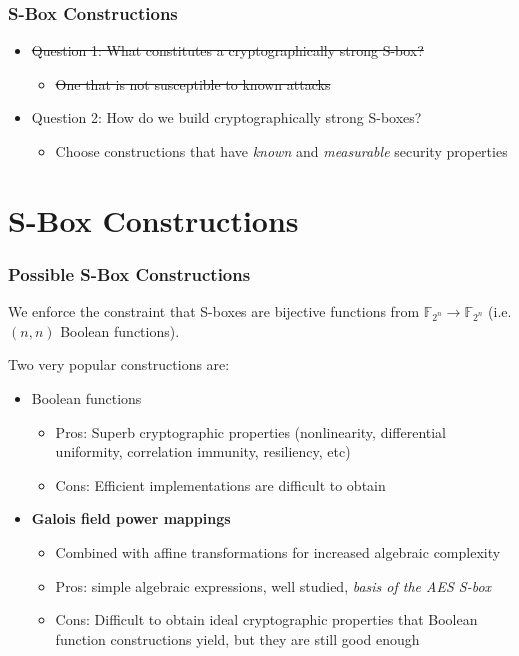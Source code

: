 \documentclass[10pt]{beamer}
\begin{document}
\begin{frame}
\frametitle{S-Box Constructions}
	\begin{itemize}
		\item \sout{Question 1: What constitutes a cryptographically strong S-box?}
		\medskip
		\begin{itemize}
			\item \sout{One that is not susceptible to known attacks}
		\end{itemize}
		\medskip
		\item Question 2: How do we build cryptographically strong S-boxes?
		\medskip
		\begin{itemize}
			\item Choose constructions that have \emph{known} and \emph{measurable} security properties
		\end{itemize}
	\end{itemize}
\end{frame}

\section{S-Box Constructions}
\begin{frame}
	\frametitle{Possible S-Box Constructions}
	We enforce the constraint that S-boxes are bijective functions from $\mathbb{F}_{2^n} \to \mathbb{F}_{2^n}$ (i.e. $(n,n)$ Boolean functions).

	\medskip

	Two very popular constructions are:
	\begin{itemize}
		\item Boolean functions
		\begin{itemize}
			\item Pros: Superb cryptographic properties (nonlinearity, differential uniformity, correlation immunity, resiliency, etc)
			\item Cons: Efficient implementations are difficult to obtain
		\end{itemize}
		\pause
		\item \textbf{Galois field power mappings}
		\begin{itemize}
			\item Combined with affine transformations for increased algebraic complexity
			\item Pros: simple algebraic expressions, well studied, \emph{basis of the AES S-box}
			\item Cons: Difficult to obtain ideal cryptographic properties that Boolean function constructions yield, but they are still good enough
		\end{itemize}
	\end{itemize}
\end{frame}
\end{document}
